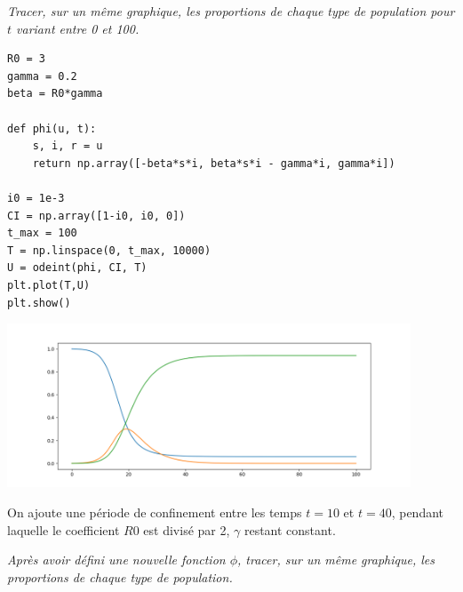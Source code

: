 \begin{Exercise}\it 
Tracer, sur un même graphique, les proportions de chaque type de population pour $t$ variant entre 0 et 100.
\end{Exercise}
\begin{Answer}
\begin{lstlisting}
R0 = 3
gamma = 0.2
beta = R0*gamma

def phi(u, t):
    s, i, r = u
    return np.array([-beta*s*i, beta*s*i - gamma*i, gamma*i])

i0 = 1e-3
CI = np.array([1-i0, i0, 0])
t_max = 100
T = np.linspace(0, t_max, 10000)
U = odeint(phi, CI, T)
plt.plot(T,U)
plt.show()
\end{lstlisting}
\begin{center}
\includegraphics[width=12cm]{TP/Images/ED2_SIR1.png}
\end{center}
\newpage
\end{Answer}
On ajoute une période de confinement entre les temps $t= 10$ et $t = 40$, pendant laquelle le coefficient $R0$ est divisé par 2, $\gamma$ restant constant.
\begin{Exercise}\it 
Après avoir défini une nouvelle fonction $\phi$, tracer, sur un même graphique, les proportions de chaque type de population.
\end{Exercise}
